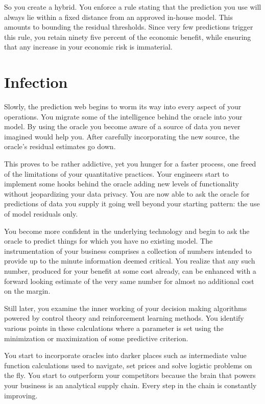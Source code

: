 So you create a hybrid. You enforce a rule stating that the prediction you use will always lie within a fixed distance from an approved in-house model. This amounts to bounding the residual thresholds. Since very few predictions trigger this rule, you retain ninety five percent of the economic benefit, while ensuring that any increase in your economic risk is immaterial. 


\section{Infection}

Slowly, the prediction web begins to worm its way into every aspect of your operations. You migrate some of the intelligence behind the oracle into your model. By using the oracle you become aware of a source of data you never imagined would help you. After carefully incorporating the new source, the oracle's residual estimates go down. 

This proves to be rather addictive, yet you hunger for a faster process, one freed of the limitations of your quantitative practices. Your engineers start to implement some hooks behind the oracle adding new levels of functionality without jeopardizing your data privacy. You are now able to ask the oracle for predictions of data you supply it going well beyond your starting pattern: the use of model residuals only.  

You become more confident in the underlying technology and begin to ask the oracle to predict things for which you have no existing model. The instrumentation of your business comprises a collection of numbers intended to provide up to the minute information deemed critical. You realize that any such number, produced for your benefit at some cost already, can be enhanced with a forward looking estimate of the very same number for almost no additional cost on the margin.

Still later, you examine the inner working of your decision making algorithms powered by control theory and reinforcement learning methods. You identify various points in these calculations where a parameter is set using the minimization or maximization of some predictive criterion.

You start to incorporate oracles into darker places such as intermediate value function calculations used to navigate, set prices and solve logistic problems on the fly. You start to outperform your competitors because the brain that powers your business is an analytical supply chain. Every step in the chain is constantly improving.  

